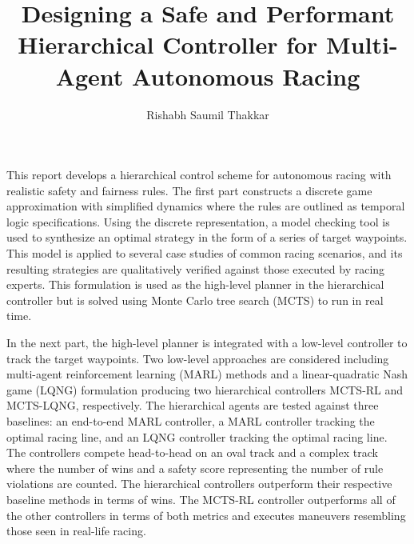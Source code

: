 \documentclass[12pt]{report}
\author{Rishabh Saumil Thakkar}  	%
\title{Designing a Safe and Performant Hierarchical Controller for Multi-Agent Autonomous Racing}
\theoremstyle{definition}
\theoremstyle{remark}
\numberwithin{equation}{section}
\begin{document}
\copyrightpage
\titlepage
\commcertpage
\begin{acknowledgments}	


\end{acknowledgments}


%
\utabstract
\indent 
This report develops a hierarchical control scheme for autonomous racing with realistic safety and fairness rules. The first part constructs a discrete game approximation with simplified dynamics where the rules are outlined as temporal logic specifications. Using the discrete representation, a model checking tool is used to synthesize an optimal strategy in the form of a series of target waypoints. This model is applied to several case studies of common racing scenarios, and its resulting strategies are qualitatively verified against those executed by racing experts. This formulation is used as the high-level planner in the hierarchical controller but is solved using Monte Carlo tree search (MCTS) to run in real time.

In the next part, the high-level planner is integrated with a low-level controller to track the target waypoints. Two low-level approaches are considered including multi-agent reinforcement learning (MARL) methods and a linear-quadratic Nash game (LQNG) formulation producing two hierarchical controllers MCTS-RL and MCTS-LQNG, respectively. The hierarchical agents are tested against three baselines: an end-to-end MARL controller, a MARL controller tracking the optimal racing line, and an LQNG controller tracking the optimal racing line. The controllers compete head-to-head on an oval track and a complex track where the number of wins and a safety score representing the number of rule violations are counted. The hierarchical controllers outperform their respective baseline methods in terms of wins. The MCTS-RL controller outperforms all of the other controllers in terms of both metrics and executes maneuvers resembling those seen in real-life racing.
\end{document}
